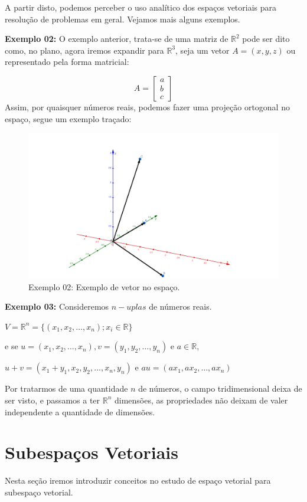 A partir disto, podemos perceber o uso analítico dos espaços vetoriais para resolução de problemas em geral. Vejamos mais alguns exemplos.

\noindent\textbf{Exemplo 02:} O exemplo anterior, trata-se de uma matriz de $\mathbb{R}^2$ pode ser dito como, no plano, agora iremos expandir para $\mathbb{R}^3$, seja um vetor $A = (x, y, z)$ ou representado pela forma matricial:

\[
A = \begin{bmatrix}
	a \\ b \\ c
\end{bmatrix}
\]
\noindent Assim, por quaisquer números reais, podemos fazer uma projeção ortogonal no espaço, segue um exemplo traçado:

\begin{figure}[H]
	\centering
	\includegraphics[scale=0.30]{exemplo02.png}
	\caption{Exemplo 02: Exemplo de vetor no espaço.}
\end{figure}

\noindent\textbf{Exemplo 03:} Consideremos $n-uplas$ de números reais.

$V = \mathbb{R}^n = \{(x_1, x_2, \ldots, x_n); x_i \in \mathbb{R}\}$

e se $u = (x_1, x_2, \ldots, x_n), v = (y_1, y_2, \ldots, y_n)$ e $a \in \mathbb{R}$,

$u + v = (x_1 + y_1, x_2, y_2, \ldots, x_n, y_n)$ e $au = (ax_1, ax_2, \ldots, ax_n)$

Por tratarmos de uma quantidade $n$ de números, o campo tridimensional deixa de ser visto, e passamos a ter $\mathbb{R}^n$ dimensões, as propriedades não deixam de valer independente a quantidade de dimensões.

\section{Subespaços Vetoriais}
Nesta seção iremos introduzir conceitos no estudo de espaço vetorial para subespaço vetorial.

